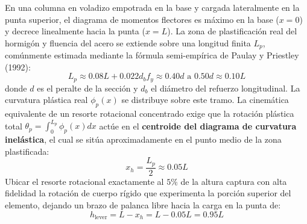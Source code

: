 \documentclass[11pt,letterpaper]{article}
\begin{document}
\begin{conceptbox}[¿Por qué ubicar la rótula plástica a $x_h = 0.05 L$? Fundamento Físico]
En una columna en voladizo empotrada en la base y cargada lateralmente en la punta superior, el diagrama de momentos flectores es máximo en la base ($x=0$) y decrece linealmente hacia la punta ($x=L$). La zona de plastificación real del hormigón y fluencia del acero se extiende sobre una longitud finita $L_p$, comúnmente estimada mediante la fórmula semi-empírica de Paulay y Priestley (1992):
\begin{equation}
L_p \approx 0.08 L + 0.022 d_b f_y \approx 0.40 d \text{ a } 0.50 d \approx 0.10 L
\end{equation}
donde $d$ es el peralte de la sección y $d_b$ el diámetro del refuerzo longitudinal. La curvatura plástica real $\phi_p(x)$ se distribuye sobre este tramo. La cinemática equivalente de un resorte rotacional concentrado exige que la rotación plástica total $\theta_p = \int_0^{L_p} \phi_p(x) dx$ actúe en el \textbf{centroide del diagrama de curvatura inelástica}, el cual se sitúa aproximadamente en el punto medio de la zona plastificada:
\begin{equation}
x_h = \frac{L_p}{2} \approx 0.05 L
\end{equation}
Ubicar el resorte rotacional exactamente al $5\%$ de la altura captura con alta fidelidad la rotación de cuerpo rígido que experimenta la porción superior del elemento, dejando un brazo de palanca libre hacia la carga en la punta de:
\begin{equation}
h_{\text{lever}} = L - x_h = L - 0.05 L = 0.95 L
\end{equation}
\end{conceptbox}
\end{document}
